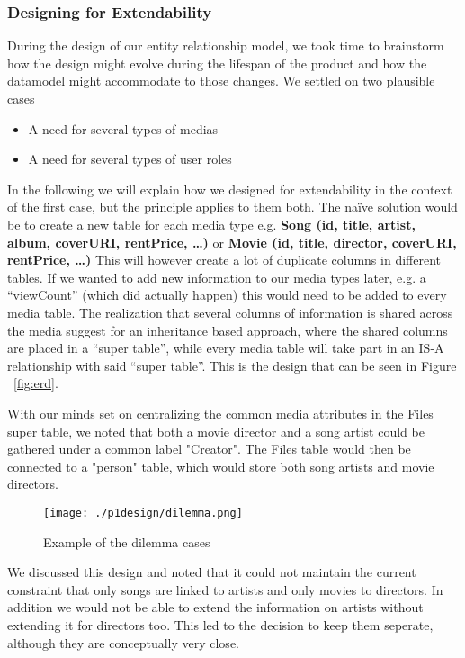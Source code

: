 \subsubsection{Designing for Extendability}
\label{sec:extendability}
During the design of our entity relationship model, we took time to brainstorm how the design might evolve during the lifespan of the product and how the datamodel might accommodate to those changes. We settled on two plausible cases
\begin{itemize}
\item A need for several types of medias
\item A need for several types of user roles
\end{itemize}
In the following we will explain how we designed for extendability in the context of the first case, but the principle applies to them both.
The naïve solution would be to create a new table for each media type e.g. 
\textbf{Song (id, title, artist, album, coverURI, rentPrice, …)} or
\textbf{Movie (id, title, director, coverURI, rentPrice, …)}
This will however create a lot of duplicate columns in different tables. If we wanted to add new information to our media types later, e.g. a “viewCount” (which did actually happen) this would need to be added to every media table.
The realization that several columns of information is shared across the media suggest for an inheritance based approach, where the shared columns are placed in a “super table”, while every media table will take part in an IS-A relationship with said “super table”. This is the design that can be seen in Figure ~\ref{fig:erd}.

With our minds set on centralizing the common media attributes in the Files super table, we noted that both a movie director and a song artist could be gathered under a common label "Creator". The Files table would then be connected to a "person" table, which would store both song artists and movie directors.
\begin{figure}[h]
	\centering
	\centerline{\texttt{[image: ./p1design/dilemma.png]}}
	\caption{Example of the dilemma cases}
	\label{fig:erddilemma}
\end{figure}

We discussed this design and noted that it could not maintain the current constraint that only songs are linked to artists and only movies to directors. In addition we would not be able to extend the information on artists without extending it for directors too. This led to the decision to keep them seperate, although they are conceptually very close.

